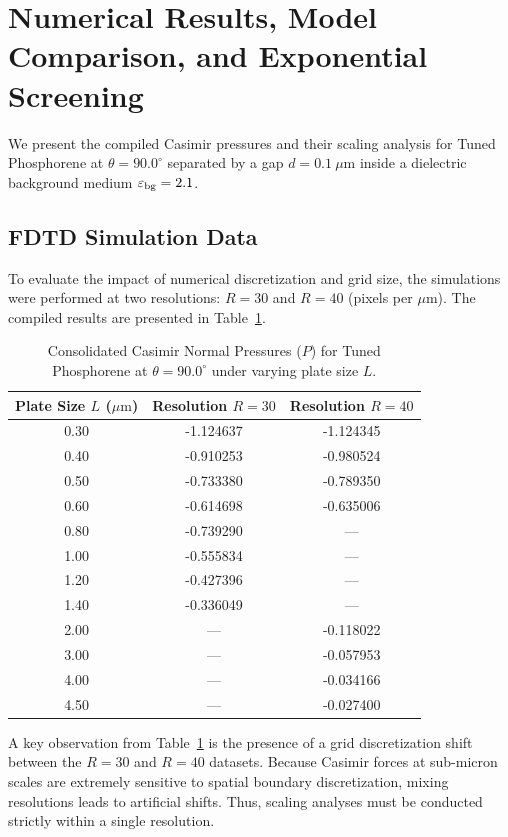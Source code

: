 \documentclass[12pt,letterpaper]{article}
\begin{document}
\section{Numerical Results, Model Comparison, and Exponential Screening}
\label{sec:numerical_results}

We present the compiled Casimir pressures and their scaling analysis for Tuned Phosphorene at $\theta = 90.0^\circ$ separated by a gap $d = 0.1\ \mu\text{m}$ inside a dielectric background medium $\varepsilon_{\rm bg} = 2.1$. 

\subsection{FDTD Simulation Data}
To evaluate the impact of numerical discretization and grid size, the simulations were performed at two resolutions: $R = 30$ and $R = 40$ (pixels per $\mu\text{m}$). The compiled results are presented in Table~\ref{tab:pressures}.

\begin{table}[htbp]
\centering
\caption{Consolidated Casimir Normal Pressures ($P$) for Tuned Phosphorene at $\theta = 90.0^\circ$ under varying plate size $L$.}
\label{tab:pressures}
\begin{tabular}{@{}ccc@{}}
\toprule
\textbf{Plate Size $L$ ($\mu\text{m}$)} & \textbf{Resolution $R=30$} & \textbf{Resolution $R=40$} \\
\midrule
0.30 & -1.124637 & -1.124345 \\
0.40 & -0.910253 & -0.980524 \\
0.50 & -0.733380 & -0.789350 \\
0.60 & -0.614698 & -0.635006 \\
0.80 & -0.739290 & --- \\
1.00 & -0.555834 & --- \\
1.20 & -0.427396 & --- \\
1.40 & -0.336049 & --- \\
2.00 & --- & -0.118022 \\
3.00 & --- & -0.057953 \\
4.00 & --- & -0.034166 \\
4.50 & --- & -0.027400 \\
\bottomrule
\end{tabular}
\end{table}

A key observation from Table~\ref{tab:pressures} is the presence of a grid discretization shift between the $R=30$ and $R=40$ datasets. Because Casimir forces at sub-micron scales are extremely sensitive to spatial boundary discretization, mixing resolutions leads to artificial shifts. Thus, scaling analyses must be conducted strictly within a single resolution.
\end{document}
